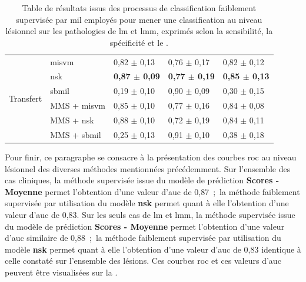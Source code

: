 \begin{table}[H]
\begin{tabular}{cllll}
        \multirow{6}{*}{Transfert}   & \gls{misvm}              & 0,82 $\pm$ 0,13             & 0,76 $\pm$ 0,17             & 0,82 $\pm$ 0,12             \\
                                     & \gls{nsk}                & \textbf{0,87 $\pm$ 0,09}    & \textbf{0,77 $\pm$ 0,19}    & \textbf{0,85 $\pm$ 0,13}    \\
                                     & \gls{sbmil}              & 0,19 $\pm$ 0,10             & 0,90 $\pm$ 0,09             & 0,30 $\pm$ 0,15             \\
                                     & MMS + \gls{misvm}        & 0,85 $\pm$ 0,10             & 0,77 $\pm$ 0,16             & 0,84 $\pm$ 0,08             \\
                                     & MMS + \gls{nsk}          & 0,88 $\pm$ 0,10             & 0,72 $\pm$ 0,19             & 0,84 $\pm$ 0,11             \\
                                     & MMS + \gls{sbmil}        & 0,25 $\pm$ 0,13             & 0,91 $\pm$ 0,10             & 0,38 $\pm$ 0,18             \\ \bottomrule
    \end{tabular}
    \caption{Table de résultats issus des processus de classification faiblement supervisée par \gls{mil} employés pour mener une classification au niveau lésionnel sur les pathologies de \gls{lm} et \gls{lmm}, exprimés selon la sensibilité, la spécificité et le \fscore{}.}
    \label{tab:results_lesion_classification_weakly_patient_lm}
\end{table}

Pour finir, ce paragraphe se consacre à la présentation des courbes \gls{roc} au niveau lésionnel des diverses méthodes mentionnées précédemment. Sur l'ensemble des cas cliniques, la méthode supervisée issue du modèle de prédiction \textbf{Scores - Moyenne} permet l'obtention d'une valeur d'\gls{auc} de 0,87~;~la méthode faiblement supervisée par utilisation du modèle \textbf{\gls{nsk}} permet quant à elle l'obtention d'une valeur d'\gls{auc} de 0,83. Sur les seuls cas de \gls{lm} et \gls{lmm}, la méthode supervisée issue du modèle de prédiction \textbf{Scores - Moyenne} permet l'obtention d'une valeur d'\gls{auc} similaire de 0,88~;~la méthode faiblement supervisée par utilisation du modèle \textbf{\gls{nsk}} permet quant à elle l'obtention d'une valeur d'\gls{auc} de 0,83 identique à celle constaté sur l'ensemble des lésions. Ces courbes \gls{roc} et ces valeurs d'\gls{auc} peuvent être visualisées sur la .\par

